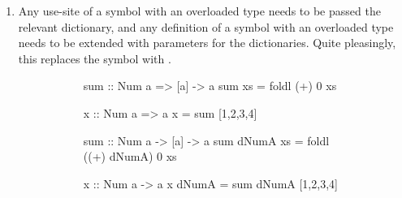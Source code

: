 \documentclass[dissertation.tex]{subfiles}
\begin{document}
{{{\begin{enumerate}
{                \begin{figure}[H]
                \centering
                \begin{subfigure}[t]{0.25\textwidth}
                \begin{haskellfigure}
                instance Eq Int where
                    (==) = foo
                    (/=) = bar
                \end{haskellfigure}
                \end{subfigure}
                \hspace{5mm}
                \begin{subfigure}[t]{0.25\textwidth}
                \begin{haskellfigure}
                dEqInt :: Eq Int
                dEqInt = Eq foo bar
                \end{haskellfigure}
                \end{subfigure}
                \end{figure}
            }
            \item
            {
                Any use-site of a symbol with an overloaded type needs to be passed the relevant dictionary, and any definition of a symbol with an overloaded type needs to be extended with parameters for the dictionaries. Quite pleasingly, this replaces the \haskell{=>} symbol with \haskell{->}.

                \begin{figure}[H]
                \centering
                \begin{subfigure}[t]{0.30\textwidth}
                \begin{haskellfigure}
                sum :: Num a => [a] -> a
                sum xs = foldl (+) 0 xs

                x :: Num a => a
                x = sum [1,2,3,4]
                \end{haskellfigure}
                \end{subfigure}
                \hspace{5mm}
                \begin{subfigure}[t]{0.45\textwidth}
                \begin{haskellfigure}
                sum :: Num a -> [a] -> a
                sum dNumA xs = foldl ((+) dNumA) 0 xs

                x :: Num a -> a
                x dNumA = sum dNumA [1,2,3,4]
                \end{haskellfigure}
                \end{subfigure}
                \end{figure}
            }
            \end{enumerate}

}}}
\end{document}
